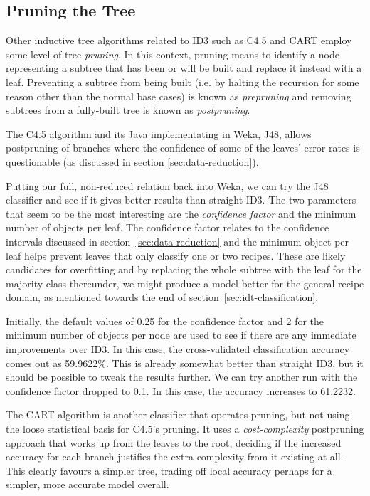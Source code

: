 \documentclass[11pt,a4paper]{article}
\begin{document}
\subsection{Pruning the Tree}

Other inductive tree algorithms related to ID3 such as C4.5 and CART employ some
level of tree \emph{pruning}. In this context, pruning means to identify a node
representing a subtree that has been or will be built and replace it instead with
a leaf. Preventing a subtree
from being built (i.e. by halting the recursion for some reason other than 
the normal base cases) is known as \emph{prepruning} and removing subtrees from
a fully-built tree is known as \emph{postpruning}.

The C4.5 algorithm and its Java implementating in Weka, J48, allows postpruning
of branches where the confidence of some of the leaves' error rates is questionable
(as discussed in section \ref{sec:data-reduction}).

Putting our full, non-reduced relation back into Weka, we can try the J48
classifier and see if it gives better results than straight ID3. The two parameters
that seem to be the most interesting are the \emph{confidence factor} and the
minimum number of objects per leaf. The confidence factor relates to the
confidence intervals discussed in section~\ref{sec:data-reduction} and
the minimum object per leaf helps prevent leaves that only classify one or two
recipes. These are likely candidates for overfitting and by replacing the whole
subtree with the leaf for the majority class thereunder, we might produce a model
better for the general recipe domain, as mentioned towards the end of
section~\ref{sec:idt-classification}.

Initially, the default values of 0.25 for the confidence factor and 2 for the minimum
number of objects per node are used to see if there are any immediate improvements
over ID3. In this case, the cross-validated classification accuracy comes out
as 59.9622\%. This is already somewhat better than straight ID3, but it should be possible to
tweak the results further. We can try another run with the confidence factor dropped
to 0.1. In this case, the accuracy increases to 61.2232.

The CART algorithm is another classifier that operates pruning, but not using
the loose statistical basis for C4.5's pruning. It uses a \emph{cost-complexity}
postpruning approach that works up from the leaves to the root, deciding if
the increased accuracy for each branch justifies the extra complexity from it
existing at all. This clearly favours a simpler tree, trading off local accuracy
perhaps for a simpler, more accurate model overall.
\end{document}
